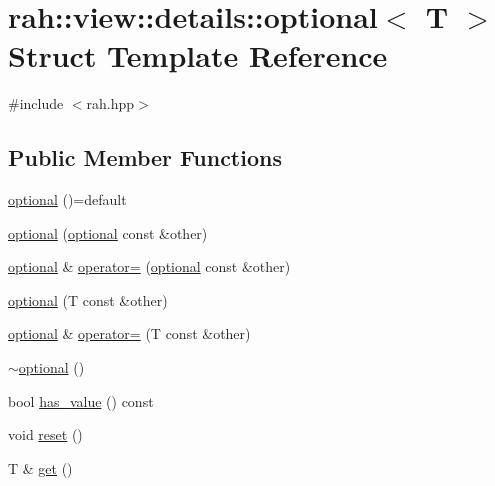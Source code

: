\hypertarget{structrah_1_1view_1_1details_1_1optional}{}\section{rah\+::view\+::details\+::optional$<$ T $>$ Struct Template Reference}
\label{structrah_1_1view_1_1details_1_1optional}


{\ttfamily \#include $<$rah.\+hpp$>$}

\subsection*{Public Member Functions}
\begin{DoxyCompactItemize}
\item 
\mbox{\hyperlink{structrah_1_1view_1_1details_1_1optional_a70b8727b22b0d88c9cc823f818286c71}{optional}} ()=default
\item 
\mbox{\hyperlink{structrah_1_1view_1_1details_1_1optional_a8c15e1445849715fdef5bf9bfdf43a91}{optional}} (\mbox{\hyperlink{structrah_1_1view_1_1details_1_1optional}{optional}} const \&other)
\item 
\mbox{\hyperlink{structrah_1_1view_1_1details_1_1optional}{optional}} \& \mbox{\hyperlink{structrah_1_1view_1_1details_1_1optional_a0caa7da5df6580090a3ea0ea25887dfa}{operator=}} (\mbox{\hyperlink{structrah_1_1view_1_1details_1_1optional}{optional}} const \&other)
\item 
\mbox{\hyperlink{structrah_1_1view_1_1details_1_1optional_a67103a826656faabd3a8d12fea4a6b33}{optional}} (T const \&other)
\item 
\mbox{\hyperlink{structrah_1_1view_1_1details_1_1optional}{optional}} \& \mbox{\hyperlink{structrah_1_1view_1_1details_1_1optional_a7e352c56530dfa8c330ac41dae64a270}{operator=}} (T const \&other)
\item 
\mbox{\hyperlink{structrah_1_1view_1_1details_1_1optional_ad6f6daea081b390c0348f2907aabcc0b}{$\sim$optional}} ()
\item 
bool \mbox{\hyperlink{structrah_1_1view_1_1details_1_1optional_a0d9e2223f4ef142e49b25d6553b306f3}{has\+\_\+value}} () const
\item 
void \mbox{\hyperlink{structrah_1_1view_1_1details_1_1optional_a3df63c25ba76b31c003c2faa70554ae7}{reset}} ()
\item 
T \& \mbox{\hyperlink{structrah_1_1view_1_1details_1_1optional_aec59d2702d103ac361def945f46b626b}{get}} ()
\item 

\end{DoxyCompactItemize}
